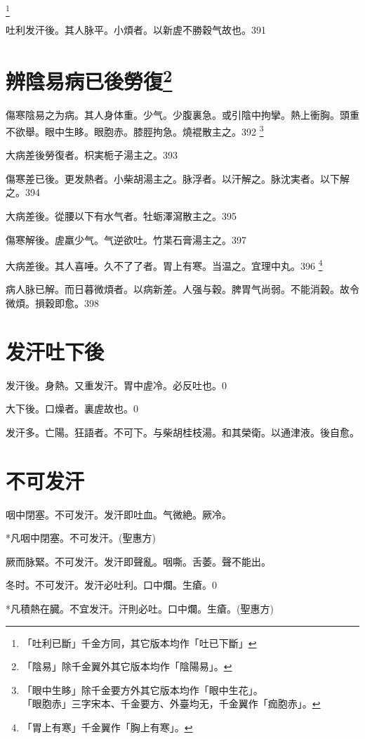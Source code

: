 \documentclass[b5paper,twoside,zihao=-4,UTF8]{ctexbook}
\begin{document}
	\footnote{「吐利已斷」千金方同，其它版本均作「吐已下斷」}

吐利发汗後。其人脉平。小煩者。以新虗不勝穀气故也。391

\chapter{辨陰易病已後勞復\footnote{「陰易」除千金翼外其它版本均作「陰陽易」。}}

傷寒陰易之为病。其人身体重。少气。少腹裏急。或引陰中拘攣。熱上衝胸。頭重不欲舉。眼中生眵。{眼胞赤。}膝脛拘急。燒裩散主之。392
	\footnote{「眼中生眵」除千金要方外其它版本均作「眼中生花」。\\「眼胞赤」三字宋本、千金要方、外臺均无，千金翼作「痂胞赤」。}

大病差後勞復者。枳実栀子湯主之。393

傷寒差已後。更发熱者。小柴胡湯主之。脉浮者。以汗解之。脉沈実者。以下解之。394

大病差後。從腰以下有水气者。牡蛎澤瀉散主之。395

傷寒解後。虗羸少气。气逆欲吐。竹枼石膏湯主之。397

大病差後。其人喜唾。久不了了者。胃上有寒。当温之。宜理中丸。396
	\footnote{「胃上有寒」千金翼作「胸上有寒」。}

病人脉已解。而日暮微煩者。以病新差。人强与穀。脾胃气尚弱。不能消穀。故令微煩。損穀即愈。398

\chapter{发汗吐下後}

发汗後。身熱。又重发汗。胃中虗冷。必反吐也。0

大下後。口燥者。裏虗故也。0

发汗多。亡陽。狂語者。不可下。与柴胡桂枝湯。和其榮衛。以通津液。後自愈。

\chapter{不可发汗}

咽中閉塞。不可发汗。发汗即吐血。气微絶。厥冷。

*凡咽中閉塞。不可发汗。(聖惠方)

厥{而脉緊}。不可发汗。发汗即聲亂。咽嘶。舌萎。聲不能出。

冬时。不可发汗。发汗必吐利。口中爛。生瘡。0

*凡積熱在臓。不宜发汗。汗則必吐。口中爛。生瘡。(聖惠方)
\end{document}
